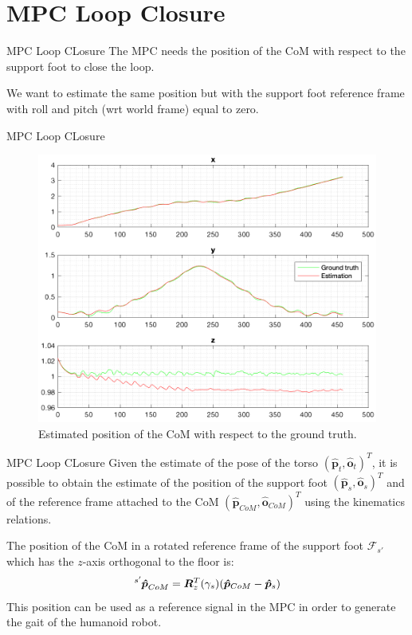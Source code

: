 \documentclass[10pt]{beamer}
\begin{document}
    \section{MPC Loop Closure}

    \begin{frame}{MPC Loop CLosure}
        \justifying
    	The MPC needs the position of the CoM with respect to the support
        foot to close the loop.

    	We want to estimate the same position but with the support foot
        \mbox{reference} frame with roll and pitch (wrt world frame) equal to zero.
    \end{frame}

    \begin{frame}{MPC Loop CLosure}
    	\begin{figure}
            \caption{Estimated position of the CoM with respect to the
                ground truth.}
            \vspace{-0.3cm}
    	    \includegraphics[scale=0.5]{images/trilateration_com.png}
    	\end{figure}
    \end{frame}

    \begin{frame}{MPC Loop CLosure}
        \justifying
    	Given the estimate of the pose of the torso
        $(\bm{\hat{p}}_t, \bm{\hat{o}}_t)^T$,
        it is possible to obtain the estimate of the position of the support foot
        $(\bm{\hat{p}}_s, \bm{\hat{o}}_s)^T$  and of the reference frame
        attached to the CoM $(\bm{\hat{p}}_{CoM}, \bm{\hat{o}}_{CoM})^T$  using the kinematics relations.

        The position of the CoM in a rotated
        reference frame of the support foot $\mathcal{F}_{s'}$ which has the $z$-axis
        orthogonal to the floor is:
        \begin{equation*}
            \tensor[^{s'}]{\bm{\hat{p}}}{_{CoM}} = \bm{R}^{T}_{z}(\gamma_s)(\bm{\hat{p}}_{CoM}-\bm{\hat{p}}_{s})
        \end{equation*}
        This position can be used as a reference signal
        in the MPC in order to generate the gait of the humanoid robot.
    \end{frame}
\end{document}
